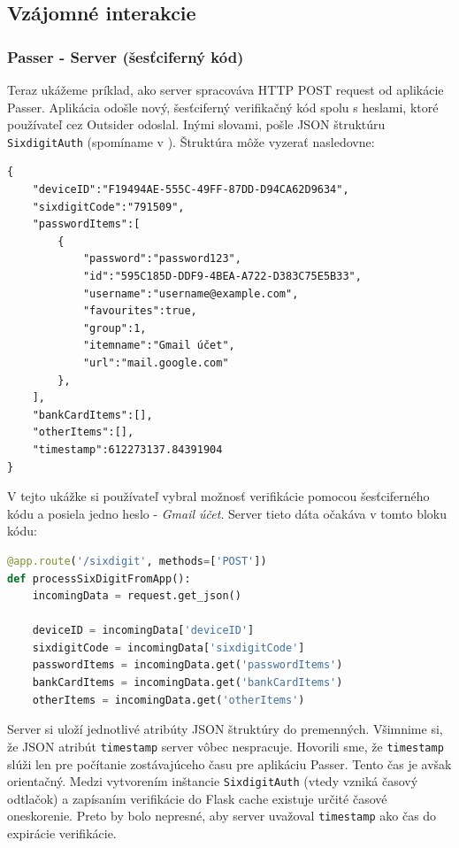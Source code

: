 \subsection{Vzájomné interakcie}
\label{vzajomne_interakcie}

\subsubsection{Passer - Server (šesťciferný kód)}
Teraz ukážeme príklad, ako server spracováva HTTP POST request od aplikácie Passer. Aplikácia odošle nový, šesťciferný verifikačný kód spolu s heslami, ktoré používateľ cez Outsider odoslal. Inými slovami, pošle JSON štruktúru \texttt{SixdigitAuth} (spomíname v ). Štruktúra môže vyzerať nasledovne: 
\newline
{}
\begin{lstlisting}[basicstyle=\small]
{
    "deviceID":"F19494AE-555C-49FF-87DD-D94CA62D9634",
    "sixdigitCode":"791509",
    "passwordItems":[
        {
            "password":"password123",
            "id":"595C185D-DDF9-4BEA-A722-D383C75E5B33",
            "username":"username@example.com",
            "favourites":true,
            "group":1,
            "itemname":"Gmail účet",
            "url":"mail.google.com"
        },
    ],
    "bankCardItems":[],
    "otherItems":[],
    "timestamp":612273137.84391904
}
\end{lstlisting}
\leavevmode\newline
\indent V tejto ukážke si používateľ vybral možnosť verifikácie pomocou šesťciferného kódu a posiela jedno heslo - \textit{Gmail účet}. Server tieto dáta očakáva v tomto bloku kódu:
\newline
\begin{lstlisting}[language=Python, basicstyle=\small]
@app.route('/sixdigit', methods=['POST'])
def processSixDigitFromApp():
    incomingData = request.get_json()
    
    deviceID = incomingData['deviceID']
    sixdigitCode = incomingData['sixdigitCode']
    passwordItems = incomingData.get('passwordItems')
    bankCardItems = incomingData.get('bankCardItems')
    otherItems = incomingData.get('otherItems')
\end{lstlisting}
\leavevmode\newline
\indent Server si uloží jednotlivé atribúty JSON štruktúry do premenných. Všimnime si, že JSON atribút \texttt{timestamp} server vôbec nespracuje. Hovorili sme, že \texttt{timestamp} slúži len pre počítanie zostávajúceho času pre aplikáciu Passer. Tento čas je avšak orientačný. Medzi vytvorením inštancie \texttt{SixdigitAuth} (vtedy vzniká časový odtlačok) a zapísaním verifikácie do Flask cache existuje určité časové oneskorenie. Preto by bolo nepresné, aby server uvažoval \texttt{timestamp} ako čas do expirácie verifikácie. 

